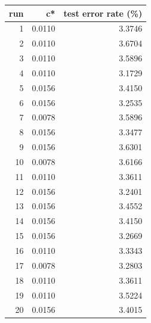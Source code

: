 \begin{tabular}{rrr}
\toprule
run & c* & test error rate (\%) \\
\midrule
1 & 0.0110 & 3.3746 \\
2 & 0.0110 & 3.6704 \\
3 & 0.0110 & 3.5896 \\
4 & 0.0110 & 3.1729 \\
5 & 0.0156 & 3.4150 \\
6 & 0.0156 & 3.2535 \\
7 & 0.0078 & 3.5896 \\
8 & 0.0156 & 3.3477 \\
9 & 0.0156 & 3.6301 \\
10 & 0.0078 & 3.6166 \\
11 & 0.0110 & 3.3611 \\
12 & 0.0156 & 3.2401 \\
13 & 0.0156 & 3.4552 \\
14 & 0.0156 & 3.4150 \\
15 & 0.0156 & 3.2669 \\
16 & 0.0110 & 3.3343 \\
17 & 0.0078 & 3.2803 \\
18 & 0.0110 & 3.3611 \\
19 & 0.0110 & 3.5224 \\
20 & 0.0156 & 3.4015 \\
\bottomrule
\end{tabular}
